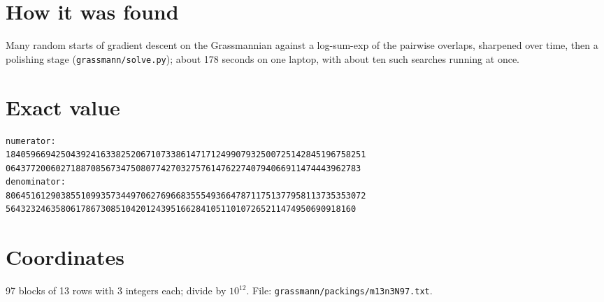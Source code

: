 \documentclass[11pt,a4paper]{article}
\begin{document}
\section{How it was found}
Many random starts of gradient descent on the Grassmannian against a log-sum-exp of the pairwise overlaps, sharpened over time, then a polishing stage (\texttt{grassmann/solve.py}); about 178 seconds on one laptop, with about ten such searches running at once.


\appendix
\section{Exact value}
{\small
\begin{verbatim}
numerator:
184059669425043924163382520671073386147171249907932500725142845196758251
06437720060271887085673475080774270327576147622740794066911474443962783
denominator:
806451612903855109935734497062769668355549366478711751377958113735353072
5643232463580617867308510420124395166284105110107265211474950690918160
\end{verbatim}}

\section{Coordinates}
97 blocks of 13 rows with 3 integers each; divide by $10^{12}$. File: \texttt{grassmann/packings/m13n3N97.txt}.
{\tiny
\begin{multicols}{3}
\end{multicols}}
\end{document}
